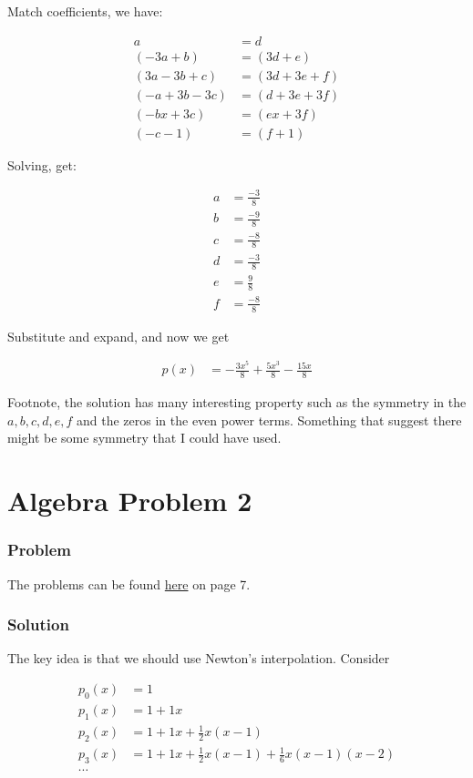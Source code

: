 \documentclass{article}
\begin{document}
Match coefficients, we have:

\begin{align*}
               a &= d             \\
       (-3a + b) &=  (3d + e)     \\
   (3a - 3b + c) &= (3d + 3e + f) \\
  (-a + 3b - 3c) &= (d + 3e + 3f) \\
      (-bx + 3c) &= (ex + 3f)     \\
        (-c - 1) &= (f + 1)
\end{align*}

Solving, get:

\begin{align*}
  a &= \frac{-3}{8} \\
  b &= \frac{-9}{8} \\
  c &= \frac{-8}{8} \\
  d &= \frac{-3}{8} \\
  e &= \frac{ 9}{8} \\
  f &= \frac{-8}{8}
\end{align*}

Substitute and expand, and now we get

\begin{align*}
  p(x) &= -\frac{3x^5}{8} + \frac{5x^3}{8} - \frac{15x}{8}
\end{align*}

Footnote, the solution has many interesting property such as the symmetry in the $ a, b, c, d, e, f $ and the zeros in the even power terms. Something that suggest there might be some symmetry that I could have used.

\section*{Algebra Problem 2}
\subsubsection*{Problem}
The problems can be found \href{https://www.math.hkust.edu.hk/~makyli/190_2010Sp/problemBk.pdf}{here} on page 7.

\subsubsection*{Solution}
The key idea is that we should use Newton's interpolation. Consider 

\begin{align*}
  p_0(x) &= 1 \\
  p_1(x) &= 1 + 1x \\
  p_2(x) &= 1 + 1x + \frac{1}{2}x(x-1) \\
  p_3(x) &= 1 + 1x + \frac{1}{2}x(x-1) + \frac{1}{6}x(x-1)(x-2)\\
  \cdots
\end{align*}
\end{document}
